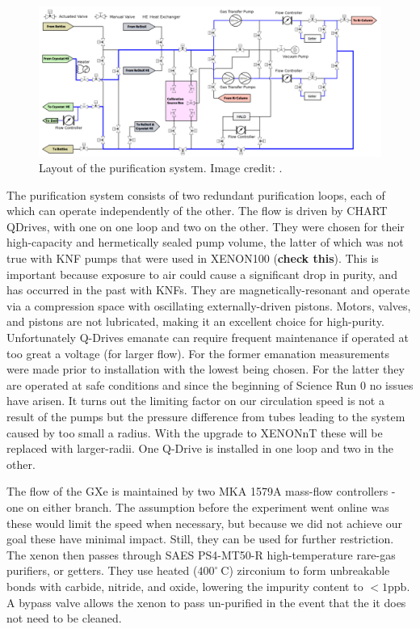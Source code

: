 \begin{figure}
\centering
\includegraphics[width=\textwidth]{PurificationLayout}
\caption{Layout of the purification system.  Image credit: .}
\label{fig:xenon1t_pur_schematic}
\end{figure}

The purification system consists of two redundant purification loops, each of which can operate independently of the other.  The flow
is driven by CHART QDrives, with one on one loop and two on the other.  They were chosen for their high-capacity and hermetically sealed
pump volume, the latter of which was not true with KNF pumps that were used in XENON100 (\textbf{check this}).  This is important because
exposure to air could cause a significant drop in purity, and has occurred in the past with KNFs.  They are
magnetically-resonant and operate via a compression space with oscillating externally-driven pistons.  Motors, valves, and pistons are
not lubricated, making it an excellent choice for high-purity.  Unfortunately Q-Drives emanate  can require frequent
maintenance if operated at too great a voltage (for larger flow).  For the former  emanation measurements were made prior to
installation with the lowest being chosen.  For the latter they are operated at safe conditions and since the beginning of Science Run 0
no issues have arisen.  It turns out the limiting factor on our circulation speed is not a result of the pumps but the pressure difference
from tubes leading to the system caused by too small a radius.  With the upgrade to XENONnT these will be replaced with larger-radii.  One
Q-Drive is installed in one loop and two in the other.

The flow of the GXe is maintained by two MKA 1579A mass-flow controllers - one on either branch.  The assumption before the experiment went
online was these would limit the speed when necessary, but because we did not achieve our goal these have minimal impact.  Still, they can
be used for further restriction.  The xenon then passes through SAES PS4-MT50-R high-temperature rare-gas purifiers, or getters.  They
use heated ($400^{\circ}\ \mathrm{C}$) zirconium to form unbreakable bonds with carbide, nitride, and oxide, lowering the impurity content
to $< 1 \mathrm{ppb}$.  A bypass valve allows the xenon to pass un-purified in the event that the it does not need to be cleaned.

